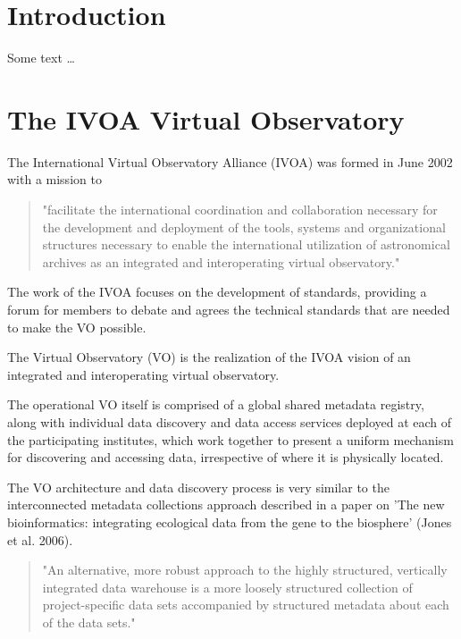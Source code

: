 \documentclass{article}
\begin{document}
\section{Introduction}

Some text \ldots

\section{The IVOA Virtual Observatory}

The International Virtual Observatory Alliance (IVOA)
was formed in June 2002 with a mission to
\begin{quote}
"facilitate the international coordination and collaboration
necessary for the development and deployment of the tools, systems and
organizational structures necessary to enable the international utilization of
astronomical archives as an integrated and interoperating virtual observatory."
\end{quote}

The work of the IVOA focuses on the development of standards, providing a forum
for members to debate and agrees the technical standards that are needed to make
the VO possible.

The Virtual Observatory (VO) is the realization of the IVOA vision of an
integrated and interoperating virtual observatory.

The operational VO itself is comprised of a global shared metadata registry,
along with individual data discovery and data access services deployed at each
of the participating institutes, which work together to present a uniform
mechanism for discovering and accessing data, irrespective of where it is
physically located.

The VO architecture and data discovery process is very similar to the
interconnected metadata collections approach described in a paper on 'The new
bioinformatics: integrating ecological data from the gene to the biosphere'
(Jones et al. 2006).

\begin{quote}
"An alternative, more robust approach to the highly structured, vertically integrated
data warehouse is a more loosely structured collection of project-specific data sets
accompanied by structured metadata about each of the data sets."
\end{quote}
\end{document}
